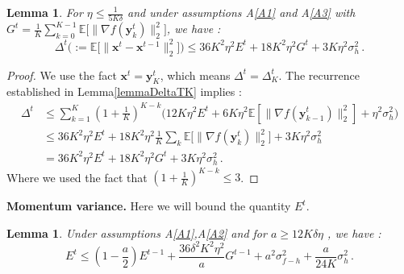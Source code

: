 \documentclass[10pt]{article} %
\theoremstyle{plain}
\newtheorem{lemma}[theorem]{Lemma}
\theoremstyle{definition}
\theoremstyle{remark}
\newcommand{\norm}[1]{\|#1\|_2}
\def\vx{{\bm{x}}}
\def\vy{{\bm{y}}}
\newcommand{\E}{\mathbb{E}}
\begin{document}
\begin{lemma}\label{BoundDelta}
For $\eta \leq \frac{1}{5 K\delta}$ and under assumptions A\ref{A1} and A\ref{A3} with $G^t = \frac{1}{K}\sum_{k=0}^{K-1} \E\big[\norm{\nabla f(\vy^t_k)}^2\big]$, we have :
$$\Delta^t \Big(:= \E\big[\norm{\vx^t - \vx^{t-1}}^2\big]\Big) \leq 36 K^2 \eta^2 E^t + 18 K^2 \eta^2 G^t + 3K\eta^2\sigma_h^2\,.$$
\end{lemma}
\begin{proof}
We use the fact $\vx^t = \vy^t_{K}$, which means $\Delta^t = \Delta^t_{K}$. The recurrence established in Lemma\ref{lemmaDeltaTK} implies :
\begin{align*}
    \Delta^t &\leq  \sum_{k=1}^{K} (1+\frac{1}{K})^{K-k}\Big(12 K\eta^2 E^t + 6K\eta^2\E[\norm{\nabla f(\vy^t_{k-1})}^2]+\eta^2\sigma_h^2\Big)\\
    &\leq 36 K^2\eta^2 E^t + 18 K^2\eta^2 \frac{1}{K}\sum_k \E\big[\norm{\nabla f(\vy^t_k)}^2\big] + 3K\eta^2\sigma_h^2\\&=36 K^2\eta^2 E^t + 18 K^2\eta^2 G^t + 3K\eta^2\sigma_h^2\, .
\end{align*}
Where we used the fact that $(1+\frac{1}{K})^{K-k}\leq 3$.
\end{proof}

\textbf{Momentum variance.} Here we will bound the quantity $E^t$.

\begin{lemma}\label{MomentumVar}
Under assumptions A\ref{A1},A\ref{A2} and for $a\geq 12 K \delta\eta$ , we have : $$E^t \leq (1 - \frac{a}{2})E^{t-1} + \frac{36\delta^2K^2\eta^2}{a}G^{t-1} + a^2 \sigma_{f-h}^2 + \frac{a}{24K}\sigma_h^2\, .$$
\end{lemma}
\end{document}

